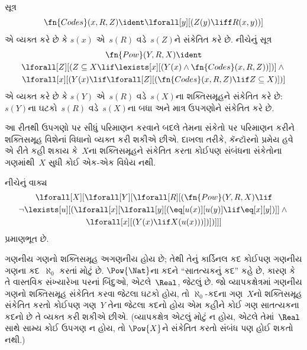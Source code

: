 \begin{prop}
સૂત્ર
  \[
  \fn{Codes}(x, R, Z) \ident \lforall[y][(Z(y) \liff
    R(x, y))]
  \]
એ વ્યક્ત કરે છે કે $s(x)$ એ~$s(R)$ વડે~$s(Z)$ને સંકેતિત કરે છે.
નીચેનું સૂત્ર
\begin{multline*}
  \fn{Pow}(Y, R, X) \ident \\
  \lforall[Z][(Z \subseteq X \lif \lexists[x][(Y(x) \land
    \fn{Codes}(x, R, Z))])] \land {} \\ \lforall[x][(Y(x) \lif
  \lforall[Z][(\fn{Codes}(x, R, Z) \lif Z \subseteq X)])]
\end{multline*}
એ વ્યક્ત કરે છે કે $s(Y)$ એ~$s(R)$ વડે~$s(X)$ના શક્તિસમૂહને
સંકેતિત કરે છે: $s(Y)$ના ઘટકો~$s(R)$ વડે~$s(X)$ના બધા અને માત્ર
ઉપગણોને સંકેતિત કરે છે.
\end{prop}

\begin{explain}
આ રીતથી ઉપગણો પર સીધું પરિમાણન કરવાને બદલે તેમના સંકેતો પર
પરિમાણન કરીને શક્તિસમૂહ વિશેનાં વિધાનો વ્યક્ત કરી શકીએ છીએ.
દાખલા તરીકે, કૅન્ટૉરનો પ્રમેય હવે એ રીતે કહી શકાય કે~$X$ના
શક્તિસમૂહને સંકેતિત કરતા કોઈપણ સંબંધના સંકેતોના ગણમાંથી~$X$
સુધી કોઈ એક-એક વિધેય નથી.
\end{explain}

\begin{prop}
નીચેનું વાક્ય
\begin{multline*}
  \lforall[X][\lforall[Y][\lforall[R][(\fn{Pow}(Y, R, X) \lif \\
      \lnot \lexists[u][(\lforall[x][\lforall[y][(\eq[u(x)][u(y)] \lif
            \eq[x][y])]] \land {}\\
        \lforall[x][(Y(x) \lif X(u(x)))])])]]]
\end{multline*}
પ્રમાણભૂત છે.
\end{prop}

\begin{explain}
ગણનીય ગણનો શક્તિસમૂહ અગણનીય હોય છે;
તેથી તેનું કાર્ડિનલ કદ કોઈપણ ગણનીય ગણના કદ~$\aleph_0$
કરતાં મોટું છે. $\Pow{\Nat}$ના કદને ``સાતત્યકનું કદ'' કહે છે,
કારણ કે તે વાસ્તવિક સંખ્યારેખા પરનાં બિંદુઓ, એટલે~$\Real$, જેટલું
છે. જો વ્યાપકક્ષેત્રમાં ગણનીય ગણનો શક્તિસમૂહ સંકેતિત
કરવા જેટલા ઘટકો હોય, તો $\aleph_0$-કદના ગણ~$X$નો શક્તિસમૂહ
સંકેતિત કરતો કોઈપણ ગણ~$Y$ તેના જેટલા કદનો હોય એમ કહીને કોઈ ગણ
સાતત્યકના કદનો છે તે વ્યક્ત કરી શકીએ છીએ. (વ્યાપકક્ષેત્ર એટલું
મોટું ન હોય, એટલે તેમાં~$\Real$ સાથે સામ્ય કોઈ ઉપગણ ન હોય, તો
$\Pow{X}$ને સંકેતિત કરતો સંબંધ પણ હોઈ શકતો નથી.)
\end{explain}

